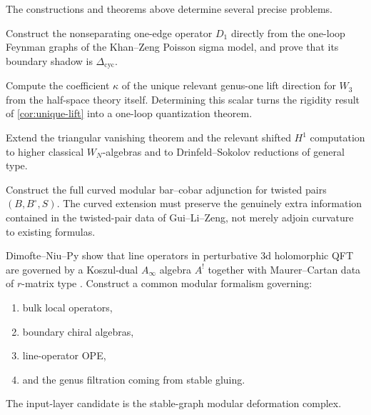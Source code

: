 The constructions and theorems above determine several precise problems.

\begin{question}
Construct the nonseparating one-edge operator $D_1$ directly from the one-loop Feynman
graphs of the Khan--Zeng Poisson sigma model, and prove that its boundary shadow is
$\Delta_{\mathrm{cyc}}$.
\end{question}

\begin{question}
Compute the coefficient $\kappa$ of the unique relevant genus-one lift direction for
$W_3$ from the half-space theory itself. Determining this scalar turns the rigidity
result of \cref{cor:unique-lift} into a one-loop quantization theorem.
\end{question}

\begin{question}[Beyond $W_3$]
Extend the triangular vanishing theorem and the relevant shifted $H^1$ computation to
higher classical $W_N$-algebras and to Drinfeld--Sokolov reductions of general type.
\end{question}

\begin{question}
Construct the full curved modular bar--cobar adjunction for twisted pairs $(B,B^\circ,S)$.
The curved extension must preserve the genuinely
extra information contained in the twisted-pair data of Gui--Li--Zeng, not merely adjoin curvature to existing formulas.
\end{question}

\begin{question}
Dimofte--Niu--Py show that line operators in perturbative 3d holomorphic QFT are governed
by a Koszul-dual $A_\infty$ algebra $A^!$ together with Maurer--Cartan data of $r$-matrix
type \cite{DNP25}. Construct a common modular formalism governing:
\begin{enumerate}[leftmargin=2.4em]
\item bulk local operators,
\item boundary chiral algebras,
\item line-operator OPE,
\item and the genus filtration coming from stable gluing.
\end{enumerate}
The input-layer candidate is the stable-graph modular deformation complex.
\end{question}

